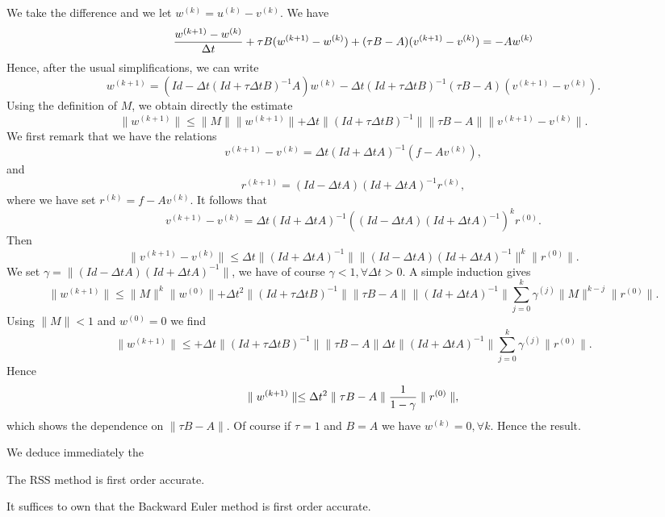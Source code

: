 {\begin{proof_amiens}
We take the difference and we let $w^{(k)}=u^{(k)}-v^{(k)}$. We have
$$
 \frac{\textstyle w^{(k+1)}-w^{(k)}} {\textstyle \Delta t} +\tau B (w^{(k+1)}-w^{(k)}) +(\tau B-A)(v^{(k+1)} -v^{(k)})=-Aw^{(k)}
 $$
Hence, after the usual simplifications, we can write
$$
w^{(k+1)}=(Id-\Delta t(Id+\tau \Delta t B)^{-1}A)w^{(k)} -\Delta t (Id+\tau \Delta t B)^{-1}(\tau B-A)(v^{(k+1)} -v^{(k)}).
$$ 
Using the definition of $M$, we obtain directly the estimate
$$
\parallel w^{(k+1)}\parallel \le  \parallel M \parallel \parallel w^{(k+1)}\parallel 
+ \Delta t \parallel  (Id+\tau \Delta t B)^{-1}\parallel \parallel  \tau B-A\parallel  \parallel v^{(k+1)} -v^{(k)}\parallel .
$$
We first remark that we have the relations
$$
v^{(k+1)} -v^{(k)}=\Delta t (Id+\Delta t A)^{-1}(f-Av^{(k)}),
$$
and
$$
r^{(k+1)}=(Id-\Delta t A)(Id+\Delta t A)^{-1} r^{(k)},
$$
where we have set $r^{(k)}=f-Av^{(k)}$. It follows that 
$$
  v^{(k+1)} -v^{(k)} = \Delta t (Id+\Delta t A)^{-1}\left((Id-\Delta t A)(Id+\Delta t A)^{-1}\right)^{k}r^{(0)}.
$$
Then
$$
\parallel  v^{(k+1)} -v^{(k)} \parallel
\le \Delta t \parallel  (Id+\Delta t A)^{-1} \parallel  \parallel  ( Id-\Delta t A)(Id+\Delta t A)^{-1}\parallel^k
\parallel  r^{(0)} \parallel .
$$
We set $\gamma=\parallel   (Id-\Delta t A)(Id+\Delta t A)^{-1}\parallel$, we have of course $\gamma <1, \forall \Delta t >0$. 
A simple induction gives
$$
\parallel w^{(k+1)}\parallel \le  \parallel M \parallel^k \parallel w^{(0)}\parallel 
+  \Delta t ^2\parallel  (Id+\tau \Delta t B)^{-1}\parallel \parallel  \tau B-A\parallel \parallel  (Id+\Delta t A)^{-1} \parallel
\displaystyle{\sum_{j=0}^k\gamma^{(j)} \parallel M \parallel^{k-j}} \parallel  r^{(0)} \parallel .
$$
Using $ \parallel M \parallel<1$ and $w^{(0)}=0$ we find
$$
\parallel w^{(k+1)}\parallel \le  
+  \Delta t \parallel  (Id+\tau \Delta t B)^{-1}\parallel \parallel  \tau B-A\parallel \Delta t \parallel  (Id+\Delta t A)^{-1} \parallel
\displaystyle{\sum_{j=0}^k\gamma^{(j)}\parallel  r^{(0)}} \parallel .
$$
Hence
$$
\parallel w^{(k+1)}\parallel \le  \Delta t^2 \parallel  \tau B-A\parallel \frac{\textstyle 1} {\textstyle 1-\gamma}\parallel  r^{(0)} \parallel ,
$$
which shows the dependence on $\parallel  \tau B-A\parallel$.
Of course if $\tau=1$ and $B=A$ we have $w^{(k)}=0, \forall k$.
Hence the result.
\end{proof_amiens}


We deduce immediately the
\begin{corollary}
The RSS method is first order accurate.
\end{corollary}
\begin{proof_amiens}
It suffices to own that the Backward Euler method is first order accurate.
\end{proof_amiens}

}
